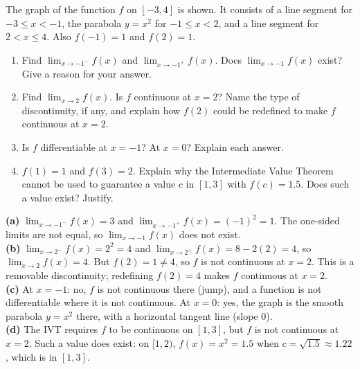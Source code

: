 \documentclass[11pt]{article}
\begin{document}
\begin{exo}{}
The graph of the function $f$ on $[-3,4]$ is shown. It consists of a line segment for $-3\le x<-1$, the parabola $y=x^2$ for $-1\le x<2$, and a line segment for $2<x\le4$. Also $f(-1)=1$ and $f(2)=1$.
\begin{center}
\end{center}
\begin{enumerate}[label=(\alph*)]
\item Find $\displaystyle\lim_{x\to-1^-}f(x)$ and $\displaystyle\lim_{x\to-1^+}f(x)$. Does $\displaystyle\lim_{x\to-1}f(x)$ exist? Give a reason for your answer.
\item Find $\displaystyle\lim_{x\to2}f(x)$. Is $f$ continuous at $x=2$? Name the type of discontinuity, if any, and explain how $f(2)$ could be redefined to make $f$ continuous at $x=2$.
\item Is $f$ differentiable at $x=-1$? At $x=0$? Explain each answer.
\item $f(1)=1$ and $f(3)=2$. Explain why the Intermediate Value Theorem cannot be used to guarantee a value $c$ in $[1,3]$ with $f(c)=1.5$. Does such a value exist? Justify.
\end{enumerate}
\begin{solution}
\textbf{(a)} $\lim_{x\to-1^-}f(x)=3$ and $\lim_{x\to-1^+}f(x)=(-1)^2=1$. The one-sided limits are not equal, so $\lim_{x\to-1}f(x)$ does not exist.\\
\textbf{(b)} $\lim_{x\to2^-}f(x)=2^2=4$ and $\lim_{x\to2^+}f(x)=8-2(2)=4$, so $\lim_{x\to2}f(x)=4$. But $f(2)=1\neq4$, so $f$ is not continuous at $x=2$. This is a removable discontinuity; redefining $f(2)=4$ makes $f$ continuous at $x=2$.\\
\textbf{(c)} At $x=-1$: no, $f$ is not continuous there (jump), and a function is not differentiable where it is not continuous. At $x=0$: yes, the graph is the smooth parabola $y=x^2$ there, with a horizontal tangent line (slope $0$).\\
\textbf{(d)} The IVT requires $f$ to be continuous on $[1,3]$, but $f$ is not continuous at $x=2$. Such a value does exist: on $[1,2)$, $f(x)=x^2=1.5$ when $c=\sqrt{1.5}\approx1.22$, which is in $[1,3]$.
\end{solution}
\end{exo}
\end{document}

